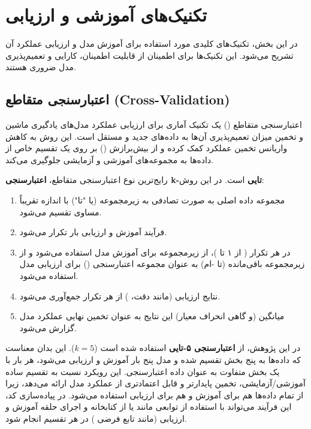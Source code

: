 \section{تکنیک‌های آموزشی و ارزیابی}
در این بخش، تکنیک‌های کلیدی مورد استفاده برای آموزش مدل  و ارزیابی عملکرد آن تشریح می‌شود. این تکنیک‌ها برای اطمینان از قابلیت اطمینان، کارایی و تعمیم‌پذیری مدل ضروری هستند.

\subsection{اعتبارسنجی متقاطع (Cross-Validation)}
اعتبارسنجی متقاطع () یک تکنیک آماری برای ارزیابی عملکرد مدل‌های یادگیری ماشین و تخمین میزان تعمیم‌پذیری آن‌ها به داده‌های جدید و مستقل است. این روش به کاهش واریانس تخمین عملکرد کمک کرده و از بیش‌برازش () بر روی یک تقسیم خاص از داده‌ها به مجموعه‌های آموزشی و آزمایشی جلوگیری می‌کند.

رایج‌ترین نوع اعتبارسنجی متقاطع، \textbf{اعتبارسنجی k-تایی } است. در این روش:
\begin{enumerate}
    \item مجموعه داده اصلی به صورت تصادفی به  زیرمجموعه (یا "تا") با اندازه تقریباً مساوی تقسیم می‌شود.
    \item فرآیند آموزش و ارزیابی  بار تکرار می‌شود.
    \item در هر تکرار ( از ۱ تا )، از  زیرمجموعه برای آموزش مدل استفاده می‌شود و از زیرمجموعه باقی‌مانده (تا -ام) به عنوان مجموعه اعتبارسنجی () برای ارزیابی مدل استفاده می‌شود.
    \item نتایج ارزیابی (مانند دقت، ) از هر  تکرار جمع‌آوری می‌شود.
    \item میانگین (و گاهی انحراف معیار) این نتایج به عنوان تخمین نهایی عملکرد مدل گزارش می‌شود.
\end{enumerate}
در این پژوهش، از \textbf{اعتبارسنجی ۵-تایی } استفاده شده است (\(k=5\)). این بدان معناست که داده‌ها به پنج بخش تقسیم شده و مدل پنج بار آموزش و ارزیابی می‌شود، هر بار با یک بخش متفاوت به عنوان داده اعتبارسنجی. این رویکرد نسبت به تقسیم ساده آموزشی/آزمایشی، تخمین پایدارتر و قابل اعتمادتری از عملکرد مدل ارائه می‌دهد، زیرا از تمام داده‌ها هم برای آموزش و هم برای ارزیابی استفاده می‌شود. در پیاده‌سازی کد، این فرآیند می‌تواند با استفاده از توابعی مانند  یا  از کتابخانه  و اجرای حلقه آموزش و ارزیابی (مانند تابع فرضی ) در هر تقسیم انجام شود.

